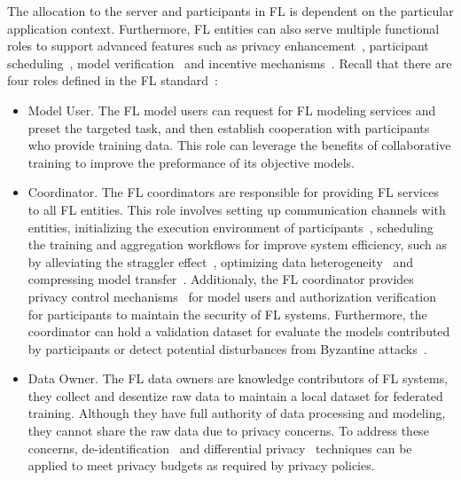 The allocation to the server and participants in FL is dependent on the particular application context. 
Furthermore, FL entities can also serve multiple functional roles to support advanced features such as privacy enhancement~\cite{geyer2017differentially, bonawitz2017practical, niu2020billion}, participant scheduling~\cite{li2022federated, abdulrahman2020fedmccs}, model verification~\cite{tekgul2021waffle, shao2022fedtracker} and incentive mechanisms~\cite{yu2020fairness}.
Recall that there are four roles defined in the FL standard~\cite{IEEEstd3652}:

\begin{itemize}
    \item Model User. The FL model users can request for FL modeling services and preset the targeted task, and then establish cooperation with participants who provide training data. This role can leverage the benefits of collaborative training to improve the preformance of its objective models.
    
    \item Coordinator. The FL coordinators are responsible for providing FL services to all FL entities. This role involves setting up communication channels with entities, initializing the execution environment of participants~\cite{hanzlik2021mlcapsule}, scheduling the training and aggregation workflows for improve system efficiency, such as by alleviating the straggler effect~\cite{li2021fedsae, chai2020tifl}, optimizing data heterogeneity~\cite{duan2019astraea, abdulrahman2020fedmccs} and compressing model transfer~\cite{konevcny2016federated, sattler2019robust}.
    Additionaly, the FL coordinator provides privacy control mechanisms~\cite{bonawitz2017practical, el2022differential, hesamifard2018privacy} for model users and authorization verification for participants to maintain the security of FL systems. 
    Furthermore, the coordinator can hold a validation dataset for evaluate the models contributed by participants or detect potential disturbances from Byzantine attacks~\cite{sattler2020byzantine}.

    \item Data Owner. The FL data owners are knowledge contributors of FL systems, they collect and desentize raw data to maintain a local dataset for federated training. Although they have full authority of data processing and modeling, they cannot share the raw data due to privacy concerns. To address these concerns, de-identification~\cite{act1996health} and differential privacy~\cite{dwork2006differential} techniques can be applied to meet privacy budgets as required by privacy policies.
    

\end{itemize}
